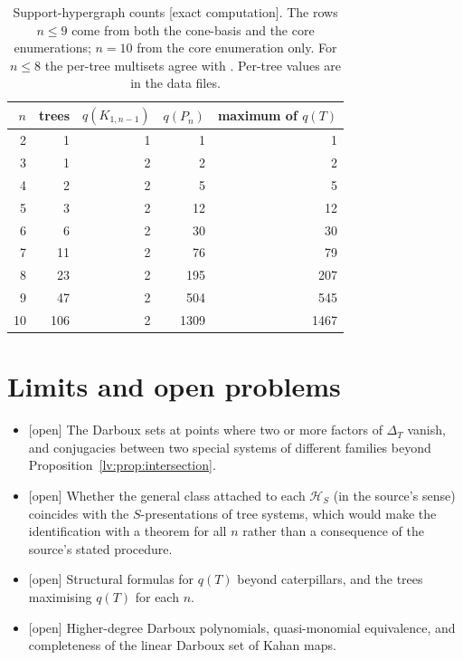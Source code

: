 \documentclass[11pt,a4paper]{article}
\theoremstyle{definition}
\theoremstyle{remark}
\newcommand{\lab}[1]{\textsf{[#1]}}
\begin{document}
\begin{table}[htbp]
\centering
\begin{tabular}{rrrrr}
\toprule
$n$ & trees & $q(K_{1,n-1})$ & $q(P_n)$ & maximum of $q(T)$\\
\midrule
2 & 1   & 1 & 1    & 1\\
3 & 1   & 2 & 2    & 2\\
4 & 2   & 2 & 5    & 5\\
5 & 3   & 2 & 12   & 12\\
6 & 6   & 2 & 30   & 30\\
7 & 11  & 2 & 76   & 79\\
8 & 23  & 2 & 195  & 207\\
9 & 47  & 2 & 504  & 545\\
10& 106 & 2 & 1309 & 1467\\
\bottomrule
\end{tabular}
\caption{Support-hypergraph counts \lab{exact computation}. The rows $n\leq9$ come from both the cone-basis and the core enumerations; $n=10$ from the core enumeration only. For $n\leq8$ the per-tree multisets agree with \cite[Table~7]{lv:K2025}. Per-tree values are in the data files.}
\label{lv:tab:counts}
\end{table}

\section{Limits and open problems}
\label{lv:sec:limits}

\begin{itemize}
\item \lab{open} The Darboux sets at points where two or more factors of $\Delta_T$ vanish, and conjugacies between two special systems of different families beyond Proposition~\ref{lv:prop:intersection}.
\item \lab{open} Whether the general class attached to each $\mathcal H_S$ (in the source's sense) coincides with the $S$-presentations of tree systems, which would make the identification with \cite[Table~7]{lv:K2025} a theorem for all $n$ rather than a consequence of the source's stated procedure.
\item \lab{open} Structural formulas for $q(T)$ beyond caterpillars, and the trees maximising $q(T)$ for each $n$.
\item \lab{open} Higher-degree Darboux polynomials, quasi-monomial equivalence, and completeness of the linear Darboux set of Kahan maps.
\end{itemize}
\end{document}
